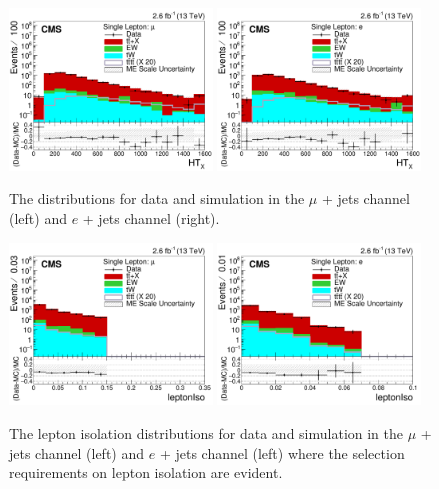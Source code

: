 \begin{figure}[ht!]
    \includegraphics[width=0.48\textwidth]{images/Run2/HTX_StackLogY.pdf}
    \includegraphics[width=0.48\textwidth]{images/Run2/HTX_StackLogY_e.pdf}
    \caption{The \HTX distributions for data and simulation in the $\mu$ + jets channel (left) and $e$ + jets channel (right).}
    \label{fig:HTX}
\end{figure} 

\begin{figure}
    \includegraphics[width=0.48\textwidth]{images/Run2/leptonIso_StackLogY.pdf}
    \includegraphics[width=0.48\textwidth]{images/Run2/leptonIso_StackLogY_e.pdf}
    \caption{The lepton isolation distributions for data and simulation in the $\mu$ + jets channel (left) and $e$ + jets channel (left) where the selection requirements on lepton isolation are evident.}
    \label{fig:lepiso}
\end{figure}
\pagebreak

